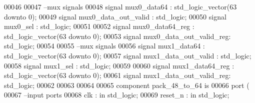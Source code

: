 \begin{DoxyCode}
00046 
00047 \textcolor{keyword}{--mux signals}
00048 \textcolor{keywordflow}{signal} \textcolor{vhdlchar}{mux0_data64}              \textcolor{vhdlchar}{:} \textcolor{comment}{std\_logic\_vector}\textcolor{vhdlchar}{(}\textcolor{vhdllogic}{}\textcolor{vhdllogic}{63} \textcolor{keywordflow}{downto} \textcolor{vhdllogic}{}\textcolor{vhdllogic}{0}\textcolor{vhdlchar}{)};
00049 \textcolor{keywordflow}{signal} \textcolor{vhdlchar}{mux0_data_out_valid}      \textcolor{vhdlchar}{:} \textcolor{comment}{std\_logic};
00050 \textcolor{keywordflow}{signal} \textcolor{vhdlchar}{mux0_sel}                 \textcolor{vhdlchar}{:} \textcolor{comment}{std\_logic};
00051 
00052 \textcolor{keywordflow}{signal} \textcolor{vhdlchar}{mux0_data64_reg}          \textcolor{vhdlchar}{:} \textcolor{comment}{std\_logic\_vector}\textcolor{vhdlchar}{(}\textcolor{vhdllogic}{}\textcolor{vhdllogic}{63} \textcolor{keywordflow}{downto} \textcolor{vhdllogic}{}\textcolor{vhdllogic}{0}\textcolor{vhdlchar}{)};
00053 \textcolor{keywordflow}{signal} \textcolor{vhdlchar}{mux0_data_out_valid_reg}\textcolor{vhdlchar}{:} \textcolor{comment}{std\_logic};
00054 
00055 \textcolor{keyword}{--mux signals}
00056 \textcolor{keywordflow}{signal} \textcolor{vhdlchar}{mux1_data64}              \textcolor{vhdlchar}{:} \textcolor{comment}{std\_logic\_vector}\textcolor{vhdlchar}{(}\textcolor{vhdllogic}{}\textcolor{vhdllogic}{63} \textcolor{keywordflow}{downto} \textcolor{vhdllogic}{}\textcolor{vhdllogic}{0}\textcolor{vhdlchar}{)};
00057 \textcolor{keywordflow}{signal} \textcolor{vhdlchar}{mux1_data_out_valid}      \textcolor{vhdlchar}{:} \textcolor{comment}{std\_logic};
00058 \textcolor{keywordflow}{signal} \textcolor{vhdlchar}{mux1_sel}                 \textcolor{vhdlchar}{:} \textcolor{comment}{std\_logic};
00059 
00060 \textcolor{keywordflow}{signal} \textcolor{vhdlchar}{mux1_data64_reg}          \textcolor{vhdlchar}{:} \textcolor{comment}{std\_logic\_vector}\textcolor{vhdlchar}{(}\textcolor{vhdllogic}{}\textcolor{vhdllogic}{63} \textcolor{keywordflow}{downto} \textcolor{vhdllogic}{}\textcolor{vhdllogic}{0}\textcolor{vhdlchar}{)};
00061 \textcolor{keywordflow}{signal} \textcolor{vhdlchar}{mux1_data_out_valid_reg}\textcolor{vhdlchar}{:} \textcolor{comment}{std\_logic};
00062 
00063 
00064 
00065 \textcolor{keywordflow}{component} pack_48_to_64 \textcolor{keywordflow}{is}
00066   \textcolor{keywordflow}{port} (
00067 \textcolor{keyword}{      --input ports }
00068       clk               : \textcolor{keywordflow}{in} \textcolor{comment}{std\_logic};
00069       reset_n           : \textcolor{keywordflow}{in} \textcolor{comment}{std\_logic};

\end{DoxyCode}
